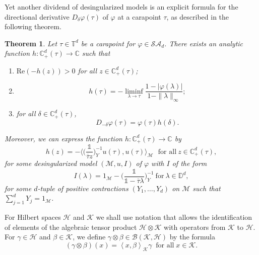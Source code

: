 \documentclass[11pt, reqno]{amsart}
\newtheorem{theorem}{Theorem}[section]
\newcommand\1{\boldsymbol {1}}
\newcommand{\ip}[2]{\left\langle #1, #2 \right\rangle}
\newcommand\beq{\begin{equation}}
\newcommand\eeq{\end{equation}}
\numberwithin{equation}{section}
\begin{document}
Yet another dividend of desingularized models is an explicit formula for the directional derivative $D_{\delta}\varphi(\tau)$ of $\varphi$ at a carapoint $\tau$, as described in the following theorem.
\begin{theorem}\label{dir-derivative-tau-intro}
    Let $\tau\in\mathbb{T}^{d}$ be a carapoint for $\varphi\in\mathcal{SA}_{d}$. 
There exists an analytic function $h:\mathbb{C}_{+}^{d}(\tau)\rightarrow\mathbb{C}$ such that
    \begin{enumerate}
        \item $\mathrm{Re}(-h(z))>0$ for all $ z\in\mathbb{C}_{+}^{d}(\tau)$;
        \item \begin{equation}\label{hfunction-intro}
            h(\tau) = -\liminf_{\lambda{\rightarrow}\tau} \dfrac{1-\lvert \varphi(\lambda)\rvert}{1-\|\lambda \|_{\infty}};
        \end{equation}
        \item for all $ \delta\in\mathbb{C}_{+}^{d}(\tau)$, 
        \begin{equation}\label{directionalderivativeD-intro}
        D_{- \delta}\varphi(\tau) = \varphi(\tau)h( \delta).
\end{equation}
    \end{enumerate}
Moreover, we can express the function $h:\mathbb{C}_{+}^{d}(\tau)\rightarrow\mathbb{C}$ by
$$ h( z) = -\bigg\langle \bigg(\dfrac{\mathds{1}}{\overline{\tau} z}\bigg)_{Y}^{-1}u(\tau),u(\tau)\bigg\rangle_{\mathcal{M}} \ ~~\text{for all}~ z\in\mathbb{C}_{+}^{d}(\tau),$$  
for some desingularized model $(\mathcal{M},u,I)$ of $\varphi$ with $I$ of the form
\begin{equation}\label{Ioperatorgeneralizedmodel-intro-2}
I(\lambda) = 1_{\mathcal{M}} - \bigg( \dfrac{\mathds{1}}{\mathds{1}-\overline{\tau}\lambda}\bigg)_{Y}^{-1} \
\text{for} \ \lambda \in \mathbb{D}^{d},
\end{equation}
for some $d$-tuple of positive contractions $(Y_{1},\hdots,Y_{d})$ on $\mathcal{M}$ such that $\sum_{j=1}^{d}Y_{j}=1_{\mathcal{M}}$. 
\end{theorem}
 
For Hilbert spaces $\mathcal{H}$ and $\mathcal{K}$ we shall use notation that allows the identification of elements of the algebraic tensor product $\mathcal{H} \otimes\mathcal{K}$ with operators from $\mathcal{K}$ to $\mathcal{H}$. For $\gamma \in \mathcal{H}$ and $ \beta \in \mathcal{K}$, we define $\gamma \otimes \beta \in \mathcal{B}(\mathcal{K}, \mathcal{H})$ by the formula
\beq \label{u-otimes-v}
(\gamma \otimes \beta) (x) = \ip{x}{ \beta}_{\mathcal{K}} \gamma \;\; \text{for all} \; x \in \mathcal{K}.
\eeq
\end{document}
